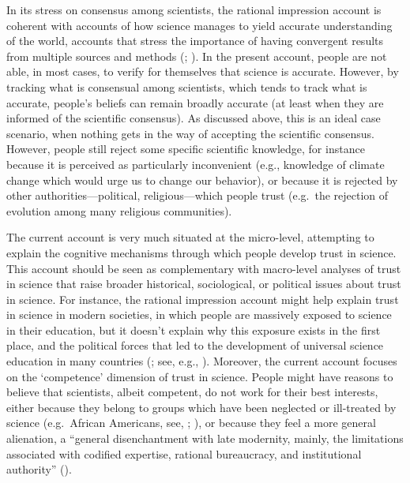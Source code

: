 \documentclass[
  jou,
  floatsintext,
  longtable,
  nolmodern,
  notxfonts,
  notimes,
  colorlinks=true,linkcolor=blue,citecolor=blue,urlcolor=blue]{apa7}
\begin{document}
In its stress on consensus among scientists, the rational impression
account is coherent with accounts of how science manages to yield
accurate understanding of the world, accounts that stress the importance
of having convergent results from multiple sources and methods
(; ).
In the present account, people are not able, in most cases, to verify
for themselves that science is accurate. However, by tracking what is
consensual among scientists, which tends to track what is accurate,
people's beliefs can remain broadly accurate (at least when they are
informed of the scientific consensus). As discussed above, this is an
ideal case scenario, when nothing gets in the way of accepting the
scientific consensus. However, people still reject some specific
scientific knowledge, for instance because it is perceived as
particularly inconvenient (e.g., knowledge of climate change which would
urge us to change our behavior), or because it is rejected by other
authorities---political, religious---which people trust (e.g.~the
rejection of evolution among many religious communities).~

The current account is very much situated at the micro-level, attempting
to explain the cognitive mechanisms through which people develop trust
in science. This account should be seen as complementary with
macro-level analyses of trust in science that raise broader historical,
sociological, or political issues about trust in science. For instance,
the rational impression account might help explain trust in science in
modern societies, in which people are massively exposed to science in
their education, but it doesn't explain why this exposure exists in the
first place, and the political forces that led to the development of
universal science education in many countries
(;
see, e.g., ). Moreover, the current account focuses on the `competence'
dimension of trust in science. People might have reasons to believe that
scientists, albeit competent, do not work for their best interests,
either because they belong to groups which have been neglected or
ill-treated by science (e.g.~African Americans, see,
;
), or because they feel a more general alienation, a ``general
disenchantment with late modernity, mainly, the limitations associated
with codified expertise, rational bureaucracy, and institutional
authority'' ().
\end{document}
